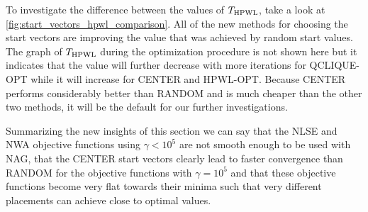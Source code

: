 To investigate the difference between the values of \(T_{\operatorname{HPWL}}\),
take a look at \cref{fig:start_vectors_hpwl_comparison}.
All of the new methods for choosing the start vectors are improving
the value that was achieved by random start values.
The graph of \(T_{\operatorname{HPWL}}\) during the optimization procedure is not shown here
but it indicates that the value will further decrease with more iterations for QCLIQUE-OPT
while it will increase for CENTER and HPWL-OPT.
Because CENTER performs considerably better than RANDOM
and is much cheaper than the other two methods,
it will be the default for our further investigations.

Summarizing the new insights of this section we can say
that the NLSE and NWA objective functions using \(\gamma < 10^5\) are not smooth enough to be used with NAG,
that the CENTER start vectors clearly lead to faster convergence than RANDOM for the objective functions with \(\gamma = 10^5\)
and that these objective functions become very flat towards their minima
such that very different placements can achieve close to optimal values.
